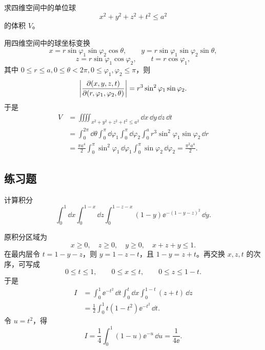 \begin{xexample}[22.3.5]
求四维空间中的单位球
\[
  x^2+y^2+z^2+t^2\le a^2
\]
的体积 $V$。
\end{xexample}
\begin{xsolution}
用四维空间中的球坐标变换
\begin{equation}
  x=r\sin\varphi_1\sin\varphi_2\cos\theta,\qquad
  y=r\sin\varphi_1\sin\varphi_2\sin\theta,
  \tag{22.5}
  \label{eq:22.5}
\end{equation}
\begin{equation}
  z=r\sin\varphi_1\cos\varphi_2,\qquad
  t=r\cos\varphi_1,
  \tag{22.6}
  \label{eq:22.6}
\end{equation}
其中 $0\le r\le a,0\le\theta<2\pi,0\le\varphi_1,\varphi_2\le\pi$，则
\[
  \abs*{\frac{\partial(x,y,z,t)}{\partial(r,\varphi_1,\varphi_2,\theta)}}
  =r^3\sin^2\varphi_1\sin\varphi_2.
\]
于是
\begin{align*}
  V&=\iiiint_{x^2+y^2+z^2+t^2\le a^2}\dd x\,\dd y\,\dd z\,\dd t\\
  &=\int_0^{2\pi}\dd\theta\int_0^\pi\dd\varphi_1\int_0^\pi\dd\varphi_2\int_0^a
  r^3\sin^2\varphi_1\sin\varphi_2\,\dd r\\
  &=\frac{\pi a^4}{2}\int_0^\pi\sin^2\varphi_1\,\dd\varphi_1\int_0^\pi\sin\varphi_2\,\dd\varphi_2
  =\frac{\pi^2a^4}{2}.
\end{align*}
\end{xsolution}

\subsection{练习题}

\begin{xexercise}[1]
计算积分
  \[
    \int_0^1\dd x\int_0^{1-x}\dd z\int_0^{1-z-x}(1-y)\ee^{-(1-y-z)^2}\,\dd y.
  \]
\end{xexercise}
\begin{xsolution}
原积分区域为
\[
 x\ge0,\quad z\ge0,\quad y\ge0,\quad x+z+y\le1.
\]
在最内层令 $t=1-y-z$，则 $y=1-z-t$，且 $1-y=z+t$。再交换 $x,z,t$ 的次序，可写成
\[
 0\le t\le1,
 \qquad0\le x\le t,
 \qquad0\le z\le1-t.
\]
于是
\begin{align*}
 I&=\int_0^1\ee^{-t^2}\,\dd t\int_0^t\dd x\int_0^{1-t}(z+t)\,\dd z\\
 &=\frac12\int_0^1t(1-t^2)\ee^{-t^2}\,\dd t.
\end{align*}
令 $u=t^2$，得
\[
 I=\frac14\int_0^1(1-u)\ee^{-u}\,\dd u
 =\boxed{\frac1{4\ee}}.
\]
\end{xsolution}


